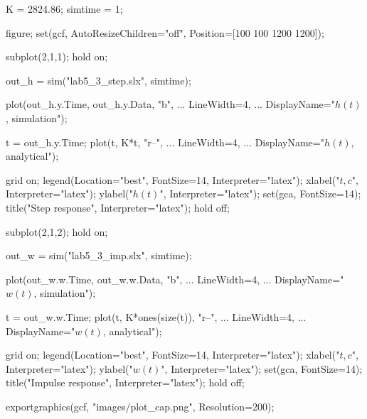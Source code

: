 
\begin{matlabcode}
K = 2824.86;
simtime = 1;

figure;
set(gcf, AutoResizeChildren="off", Position=[100 100 1200 1200]);

subplot(2,1,1);
hold on;

out_h = sim("lab5_3_step.slx", simtime);


plot(out_h.y.Time, out_h.y.Data, "b", ...
     LineWidth=4, ...
     DisplayName="$h(t)$, simulation");

t = out_h.y.Time;
plot(t, K*t, "r--", ...
     LineWidth=4, ...
     DisplayName="$h(t)$, analytical");

grid on;
legend(Location="best", FontSize=14, Interpreter="latex");
xlabel("$t, c$", Interpreter="latex");
ylabel("$h(t)$", Interpreter="latex");
set(gca, FontSize=14);
title("Step response", Interpreter="latex");
hold off;

subplot(2,1,2);
hold on;

out_w = sim("lab5_3_imp.slx", simtime);

plot(out_w.w.Time, out_w.w.Data, "b", ...
     LineWidth=4, ...
     DisplayName="$w(t)$, simulation");

t = out_w.w.Time;
plot(t, K*ones(size(t)), "r--", ...
     LineWidth=4, ...
     DisplayName="$w(t)$, analytical");

grid on;
legend(Location="best", FontSize=14, Interpreter="latex");
xlabel("$t, c$", Interpreter="latex");
ylabel("$w(t)$", Interpreter="latex");
set(gca, FontSize=14);
title("Impulse response", Interpreter="latex");
hold off;

exportgraphics(gcf, "images/plot_cap.png", Resolution=200);
\end{matlabcode}


